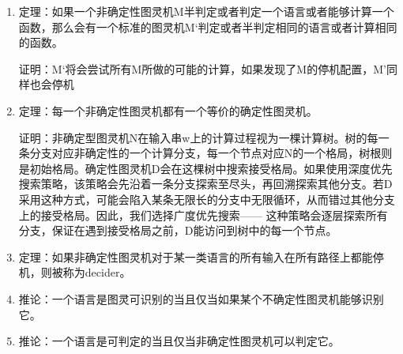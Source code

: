 \documentclass[UTF8]{ctexart}
\begin{document}
\begin{enumerate}
    \item 定理：如果一个非确定性图灵机M半判定或者判定一个语言或者能够计算一个函数，那么会有一个标准的图灵机M‘判定或者半判定相同的语言或者计算相同的函数。
    
    证明：M‘将会尝试所有M所做的可能的计算，如果发现了M的停机配置，M’同样也会停机

    \item 定理：每一个非确定性图灵机都有一个等价的确定性图灵机。
    
    证明：非确定型图灵机N在输入串w上的计算过程视为一棵计算树。树的每一条分支对应非确定性的一个计算分支，每一个节点对应N的一个格局，树根则是初始格局。确定性图灵机D会在这棵树中搜索接受格局。如果使用深度优先搜索策略，该策略会先沿着一条分支探索至尽头，再回溯探索其他分支。若D采用这种方式，可能会陷入某条无限长的分支中无限循环，从而错过其他分支上的接受格局。因此，我们选择广度优先搜索—— 这种策略会逐层探索所有分支，保证在遇到接受格局之前，D能访问到树中的每一个节点。

    \item 定理：如果非确定性图灵机对于某一类语言的所有输入在所有路径上都能停机，则被称为decider。
    
    \item 推论：一个语言是图灵可识别的当且仅当如果某个不确定性图灵机能够识别它。
    
    \item 推论：一个语言是可判定的当且仅当非确定性图灵机可以判定它。
\end{enumerate}
\end{document}
